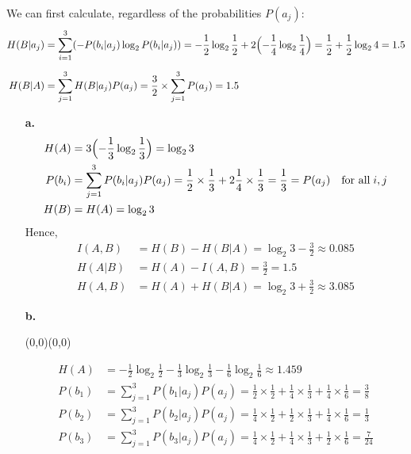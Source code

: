 \documentclass[11pt]{article}
\newcommand{\moveup}{\begin{picture}(0,0)(0,0)\end{picture}\vspace*{-8.15mm}}
\begin{document}
\quad
We can first calculate, regardless of the probabilities $P(a_j)$:
 \begin{align*}
   H(B|a_j)&= \sum_{i=1}^3 (-P(b_i|a_j)\log_2 P(b_i|a_j))
            = -\frac{1}{2}\log_2\frac{1}{2} + 2\Bigl(-\frac{1}{4}\log_2 \frac{1}{4}\Bigr)
            =  \frac{1}{2} + \frac{1}{2}\log_2 4
            = 1.5\\[2mm]
   H(B|A)  &= \sum_{j=1}^3 H(B|a_j)P(a_j)
            =  \frac{3}{2}\times \sum_{j=1}^3 P(a_j)
            = 1.5
\end{align*}
\begin{itemize}
  \item[{\bf a.}]
   \begin{align*}
   H(A)    &= 3\Bigl(-\frac{1}{3}\log_2\frac{1}{3}\Bigr) = \log_2 3\\
   P(b_i)  &= \sum_{j=1}^3 P(b_i|a_j)P(a_j)
            = \frac{1}{2}\times\frac{1}{3} + 2\frac{1}{4}\times\frac{1}{3}
            = \frac{1}{3}
            = P(a_j) \quad\text{for all}\; i,j\\
   H(B)    &= H(A) = \log_2 3\\
  \end{align*}
  Hence,
  \begin{align*}
    I(A,B)&= H(B) - H(B|A) = \log_2 3 - \frac{3}{2} \approx 0.085\\
    H(A|B)&= H(A) - I(A,B) = \frac{3}{2} = 1.5\\
    H(A,B)&= H(A) + H(B|A) = \log_2 3 + \frac{3}{2}\approx 3.085
  \end{align*}
  \item[{\bf b.}]\moveup
   \begin{align*}
    H(A)    &= -\frac{1}{2}\log_2\frac{1}{2}-\frac{1}{3}\log_2\frac{1}{3}-\frac{1}{6}\log_2\frac{1}{6}
             \approx 1.459\\
    P(b_1)  &= \sum_{j=1}^3 P(b_1|a_j)P(a_j)
             = \frac{1}{2}\times\frac{1}{2}
              +\frac{1}{4}\times\frac{1}{3}
              +\frac{1}{4}\times\frac{1}{6}
             = \frac{3}{8}\\
    P(b_2)  &= \sum_{j=1}^3 P(b_2|a_j)P(a_j)
             = \frac{1}{4}\times\frac{1}{2}
              +\frac{1}{2}\times\frac{1}{3}
              +\frac{1}{4}\times\frac{1}{6}
             = \frac{1}{3}\\
    P(b_3)  &= \sum_{j=1}^3 P(b_3|a_j)P(a_j)
             = \frac{1}{4}\times\frac{1}{2}
              +\frac{1}{4}\times\frac{1}{3}
              +\frac{1}{2}\times\frac{1}{6}
             = \frac{7}{24}\\

\end{align*}
\end{itemize}
\end{document}
